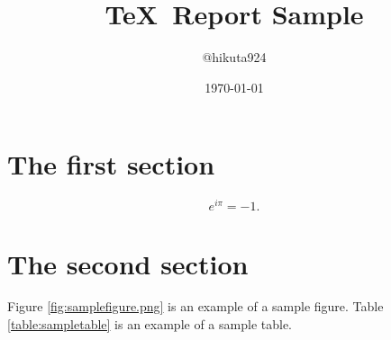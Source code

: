 
\title{\TeX\ Report Sample}
\author{@hikuta924}
\date{\today}

\maketitle

\section{The first section}
\begin{equation}
	e^{i \pi} = -1.
\end{equation}

\section{The second section}
Figure \ref{fig:samplefigure.png} is an example of a sample figure.
Table \ref{table:sampletable} is an example of a sample table.


\cite{Sam2014}



